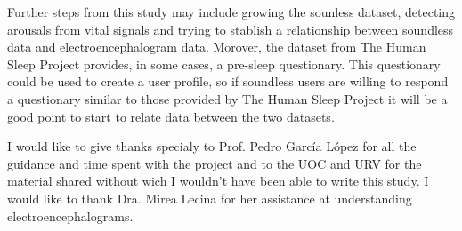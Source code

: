 Further steps from this study may include growing the sounless dataset, detecting arousals from vital signals and trying to stablish a relationship between soundless data and electroencephalogram data. Morover, the dataset from The Human Sleep Project provides, in some cases, a pre-sleep questionary. This questionary could be used to create a user profile, so if soundless users are willing to respond a questionary similar to those provided by The Human Sleep Project it will be a good point to start to relate data between the two datasets.  

I would like to give thanks specialy to Prof. Pedro Garc\'ia L\'opez for all the guidance and time spent with the project and to the UOC and URV for the material shared without wich I wouldn't have been able to write this study. I would like to thank Dra. Mirea Lecina for her assistance at understanding electroencephalograms.


